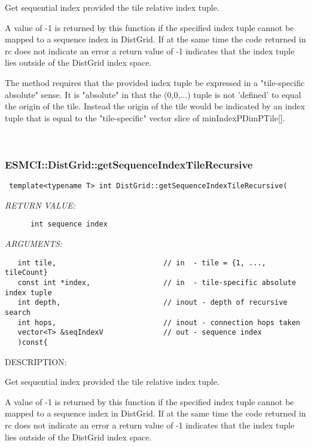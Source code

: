       Get sequential index provided the tile relative index tuple.
  
      A value of -1 is returned by this function if the specified index tuple
      cannot be mapped to a sequence index in DistGrid. If at the same time
      the code returned in rc does not indicate an error a return value of -1
      indicates that the index tuple lies outside of the DistGrid index space.
  
      The method requires that the
      provided index tuple be expressed in a "tile-specific absolute" sense.
      It is "absolute" in that the (0,0,...) tuple is not 'defined' to
      equal the origin of the tile. Instead the origin of the tile would
      be indicated by an index tuple that is equal to the "tile-specific"
      vector slice of minIndexPDimPTile[].
   
 
\mbox{}\hrulefill\
 
\subsubsection [ESMCI::DistGrid::getSequenceIndexTileRecursive] {ESMCI::DistGrid::getSequenceIndexTileRecursive}


  
\begin{verbatim} template<typename T> int DistGrid::getSequenceIndexTileRecursive(\end{verbatim}{\em RETURN VALUE:}
\begin{verbatim}      int sequence index\end{verbatim}{\em ARGUMENTS:}
\begin{verbatim}   int tile,                         // in  - tile = {1, ..., tileCount}
   const int *index,                 // in  - tile-specific absolute index tuple
   int depth,                        // inout - depth of recursive search
   int hops,                         // inout - connection hops taken
   vector<T> &seqIndexV              // out - sequence index
   )const{\end{verbatim}
{\sf DESCRIPTION:\\ }


      Get sequential index provided the tile relative index tuple.
  
      A value of -1 is returned by this function if the specified index tuple
      cannot be mapped to a sequence index in DistGrid. If at the same time
      the code returned in rc does not indicate an error a return value of -1
      indicates that the index tuple lies outside of the DistGrid index space.
  
